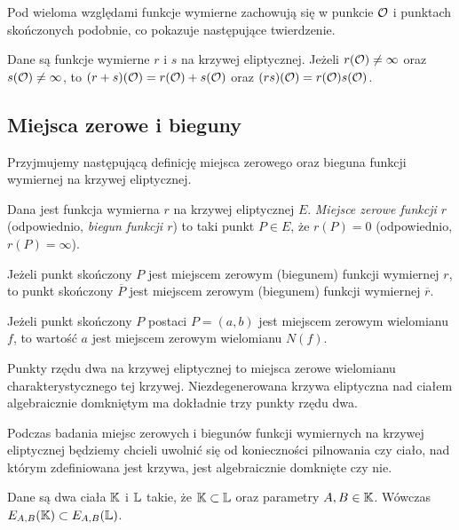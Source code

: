 Pod wieloma względami funkcje wymierne zachowują się
w punkcie $\mathcal{O}$ i punktach skończonych podobnie,
co pokazuje następujące twierdzenie.

\begin{theorem}
Dane są funkcje wymierne $r$ i $s$ na krzywej eliptycznej.
Jeżeli $r(\mathcal{O}) \neq \infty$ oraz $s(\mathcal{O}) \neq \infty$,
to $(r + s)(\mathcal{O}) = r(\mathcal{O}) + s(\mathcal{O})$
oraz $(rs)(\mathcal{O}) = r(\mathcal{O})s(\mathcal{O})$.
\end{theorem}

\subsection*{Miejsca zerowe i bieguny}

Przyjmujemy następującą definicję
miejsca zerowego oraz bieguna funkcji wymiernej na krzywej eliptycznej.

\begin{definition}
Dana jest funkcja wymierna $r$ na krzywej eliptycznej $E$.
\emph{Miejsce zerowe funkcji $r$} (odpowiednio, \emph{biegun funkcji $r$})
to taki punkt $P \in E$, że $r(P) = 0$ (odpowiednio, $r(P) = \infty$).
\end{definition}

\begin{fact}
Jeżeli punkt skończony $P$
jest miejscem zerowym (biegunem) funkcji wymiernej $r$,
to punkt skończony $\overline{P}$
jest miejscem zerowym (biegunem) funkcji wymiernej $\overline{r}$.
\end{fact}

\begin{corollary}\label{zero_of_norm_coro}
Jeżeli punkt skończony $P$ postaci $P = (a, b)$
jest miejscem zerowym wielomianu $f$,
to wartość $a$ jest miejscem zerowym wielomianu $N(f)$.
\end{corollary}

\begin{fact}
Punkty rzędu dwa na krzywej eliptycznej
to miejsca zerowe wielomianu charakterystycznego tej krzywej.
Niezdegenerowana krzywa eliptyczna nad ciałem algebraicznie domkniętym
ma dokładnie trzy punkty rzędu dwa.
\end{fact}

Podczas badania miejsc zerowych i biegunów
funkcji wymiernych na krzywej eliptycznej
będziemy chcieli uwolnić się od konieczności pilnowania
czy ciało, nad którym zdefiniowana jest krzywa,
jest algebraicznie domknięte czy nie.

\begin{fact}
Dane są dwa ciała $\mathbb{K}$ i $\mathbb{L}$ takie, że $\mathbb{K} \subset \mathbb{L}$
oraz parametry $A,B \in \mathbb{K}$.
Wówczas $E_{A,B}(\mathbb{K}) \subset E_{A,B}(\mathbb{L})$.
\end{fact}

